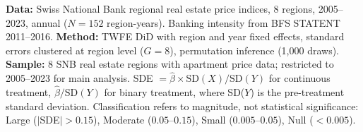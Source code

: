 \begin{table}[t]
\begin{minipage}{\textwidth}
\textbf{Data:} Swiss National Bank regional real estate price indices, 8 regions, 2005--2023, annual ($N = 152$ region-years). Banking intensity from BFS STATENT 2011--2016.
\textbf{Method:} TWFE DiD with region and year fixed effects, standard errors clustered at region level ($G = 8$), permutation inference (1,000 draws).
\textbf{Sample:} 8 SNB real estate regions with apartment price data; restricted to 2005--2023 for main analysis.
SDE $= \hat{\beta} \times \text{SD}(X) / \text{SD}(Y)$ for continuous treatment, $\hat{\beta} / \text{SD}(Y)$ for binary treatment, where SD($Y$) is the pre-treatment standard deviation. Classification refers to magnitude, not statistical significance: Large ($|$SDE$| > 0.15$), Moderate ($0.05$--$0.15$), Small ($0.005$--$0.05$), Null ($< 0.005$).
\end{minipage}
\end{table}

